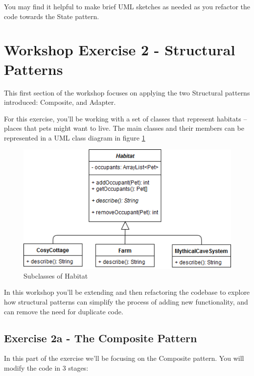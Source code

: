 \documentclass[
]{book}
\begin{document}
You may find it helpful to make brief UML sketches as needed as you refactor the code towards the State pattern.

\hypertarget{structural}{%
\section{Workshop Exercise 2 - Structural Patterns}\label{structural}}

This first section of the workshop focuses on applying the two Structural patterns introduced: Composite, and Adapter.

For this exercise, you'll be working with a set of classes that represent habitats -- places that pets might want to live. The main classes and their members can be represented in a UML class diagram in figure \ref{fig:habitat-fig}

\begin{figure}

{\centering \includegraphics[width=1\linewidth]{images/Habitat} 

}

\caption{Subclasses of Habitat}\label{fig:habitat-fig}
\end{figure}

In this workshop you'll be extending and then refactoring the codebase to explore how structural patterns can simplify the process of adding new functionality, and can remove the need for duplicate code.

\hypertarget{composite}{%
\subsection{Exercise 2a - The Composite Pattern}\label{composite}}

In this part of the exercise we'll be focusing on the Composite pattern. You will modify the code in 3 stages:
\end{document}
